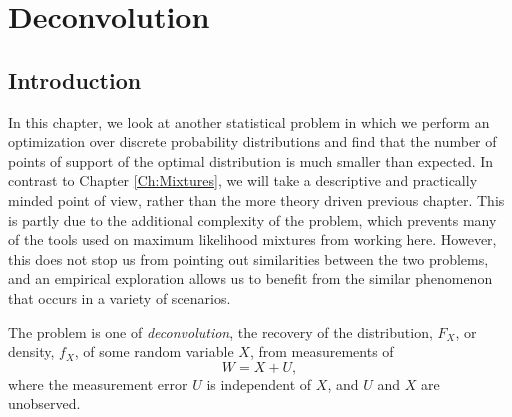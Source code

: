 \chapter{Deconvolution}
\label{Ch:Deconvolution}




\section{Introduction}
	In this chapter, we look at another statistical problem in which we perform an optimization over discrete probability distributions and find that the number of points of support of the optimal distribution is much smaller than expected. In contrast to Chapter \ref{Ch:Mixtures}, we will take a descriptive and practically minded point of view, rather than the more theory driven previous chapter. This is partly due to the additional complexity of the problem, which prevents many of the tools used on maximum likelihood mixtures from working here. However, this does not stop us from pointing out similarities between the two problems, and an empirical exploration allows us to benefit from the similar phenomenon that occurs in a variety of scenarios.

	The problem is one of \emph{deconvolution}, the recovery of the distribution, $F_X$, or density, $f_X$, of some random variable $X$, from measurements of
	\begin{equation}
		W = X + U,
		\label{eq:W=X+U}
	\end{equation}
	where the measurement error $U$ is independent of $X$, and $U$ and $X$ are unobserved. %

